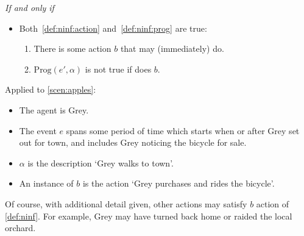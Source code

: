 \begin{note}
\begin{definition}[\ninf{2}]
    \emph{If and only if}

    \begin{itemize}
    \item
      Both~\ref{def:ninf:action} and~\ref{def:ninf:prog} are true:
      \begin{enumerate}[label=\alph*., ref=(\alph*)]
      \item
        \label{def:ninf:action}
        There is some action \(b\) that \vAgent{} may (immediately) do.
      \item
        \label{def:ninf:prog}
        \(\text{Prog}(e', \alpha)\) is not true if \vAgent{} does \(b\).
      \end{enumerate}
    \end{itemize}
    \vspace{-\baselineskip}
  \end{definition}

  \noindent%
  Applied to \autoref{scen:apples}:

  \begin{itemize}[noitemsep]
  \item
    The agent is Grey.
  \item
    The event \(e\) spans some period of time which starts when or after Grey set out for town, and includes Grey noticing the bicycle for sale.
  \item
    \(\alpha\) is the description `Grey walks to town'.
  \item
    An instance of \(b\) is the action `Grey purchases and rides the bicycle'.
  \end{itemize}

  \noindent%
  Of course, with additional detail given, other actions may satisfy \(b\) action of \autoref{def:ninf}.
  For example, Grey may have turned back home or raided the local orchard.
\end{note}

